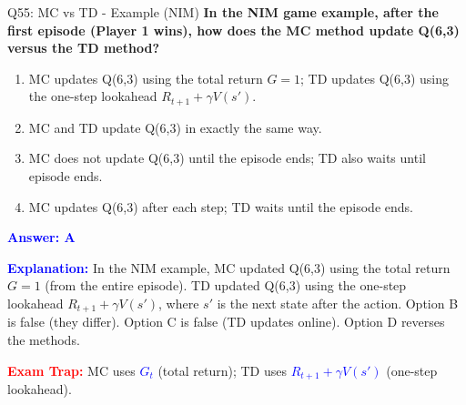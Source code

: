 \documentclass[8pt]{beamer}
\begin{document}
\begin{frame}{Q55: MC vs TD - Example (NIM)}
	\fontsize{6.5}{7.5}\selectfont
	\textbf{In the NIM game example, after the first episode (Player 1 wins), how does the MC method update Q(6,3) versus the TD method?}
	
	\begin{enumerate}
		\item MC updates Q(6,3) using the total return $G=1$; TD updates Q(6,3) using the one-step lookahead $R_{t+1} + \gamma V(s')$.
		\item MC and TD update Q(6,3) in exactly the same way.
		\item MC does not update Q(6,3) until the episode ends; TD also waits until episode ends.
		\item MC updates Q(6,3) after each step; TD waits until the episode ends.
	\end{enumerate}
	
	\vspace{0.1cm}
	\textcolor{blue}{\textbf{Answer: A}}
	\vspace{0.1cm}
	
	\textcolor{blue}{\textbf{Explanation:}} In the NIM example, MC updated Q(6,3) using the total return $G=1$ (from the entire episode). TD updated Q(6,3) using the one-step lookahead $R_{t+1} + \gamma V(s')$, where $s'$ is the next state after the action. Option B is false (they differ). Option C is false (TD updates online). Option D reverses the methods.
	
	\textcolor{red}{\textbf{Exam Trap:}} MC uses \textcolor{blue}{$G_t$} (total return); TD uses \textcolor{blue}{$R_{t+1} + \gamma V(s')$} (one-step lookahead).
\end{frame}
\end{document}
